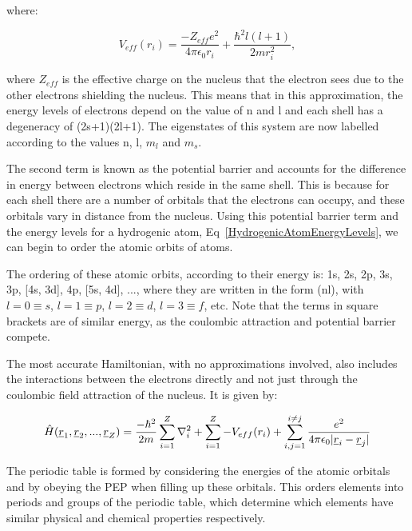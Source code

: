 \noindent where:

\begin{equation}
    V_{eff}(r_i) = \frac{-Z_{eff}e^2}{4 \pi \epsilon_0 r_i} + \frac{\hbar^2 l(l + 1)}{2mr^2_i},
    \label{ScreenedPotential}
\end{equation}

\noindent where $Z_{eff}$ is the effective charge on the nucleus that the electron sees due to the other electrons shielding the nucleus. This means that in this approximation, the energy levels of electrons depend on the value of n and l and each shell has a degeneracy of (2s+1)(2l+1). The eigenstates of this system are now labelled according to the values n, l, $m_l$ and $m_s$. 

\noindent The second term is known as the potential barrier and accounts for the difference in energy between electrons which reside in the same shell. This is because for each shell there are a number of orbitals that the electrons can occupy, and these orbitals vary in distance from the nucleus. Using this potential barrier term and the energy levels for a hydrogenic atom, Eq~\ref{HydrogenicAtomEnergyLevels}, we can begin to order the atomic orbits of atoms. 

\noindent The ordering of these atomic orbits, according to their energy is: 1s, 2s, 2p, 3s, 3p, [4s, 3d], 4p, [5s, 4d], ..., where they are written in the form (nl), with $l = 0 \equiv s$, $l = 1 \equiv p$, $l = 2 \equiv d$, $l = 3 \equiv f$, etc. Note that the terms in square brackets are of similar energy, as the coulombic attraction and potential barrier compete.

\noindent The most accurate Hamiltonian, with no approximations involved, also includes the interactions between the electrons directly and not just through the coulombic field attraction of the nucleus. It is given by:

\begin{equation}
    \Hat{H}(\underline{r}_1, \underline{r}_2, ..., \underline{r}_Z) = \frac{-\hbar^2}{2m} \sum^Z_{i=1} \nabla^2_i + \sum^Z_{i=1} -V_{eff}(r_i) + \sum_{i, j = 1}^{i \neq j} \frac{e^2}{4 \pi \epsilon_0 | \underline{r}_i - \underline{r}_j|} 
    \label{FullHamiltonian}
\end{equation}

\noindent The periodic table is formed by considering the energies of the atomic orbitals and by obeying the PEP when filling up these orbitals. This orders elements into periods and groups of the periodic table, which determine which elements have similar physical and chemical properties respectively. 

